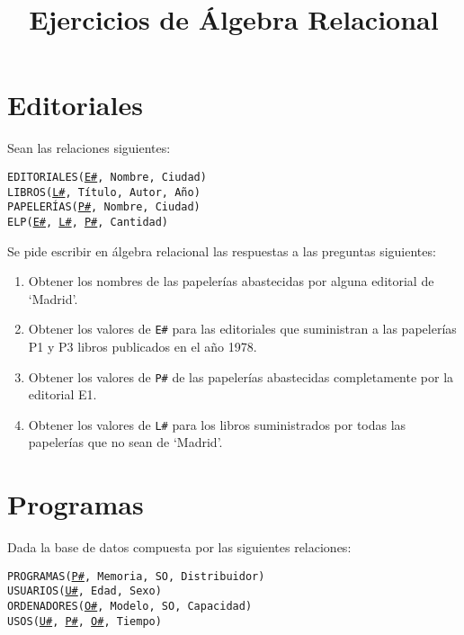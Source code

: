 \documentclass{db-practice}
\begin{document}
\title{Ejercicios de Álgebra Relacional}

\section{Editoriales}

Sean las relaciones siguientes:

\begin{addmargin}[1.5em]{0em}
    \texttt{EDITORIALES(\underline{E\#}, Nombre, Ciudad)}\\
    \texttt{LIBROS(\underline{L\#}, Título, Autor, Año)}\\
    \texttt{PAPELERÍAS(\underline{P\#}, Nombre, Ciudad)}\\
    \texttt{ELP(\underline{E\#}, \underline{L\#}, \underline{P\#}, Cantidad)}
\end{addmargin}


Se pide escribir en álgebra relacional las respuestas a las preguntas siguientes:

\begin{enumerate}
    \item Obtener los nombres de las papelerías abastecidas por alguna editorial de `Madrid'.
    \item Obtener los valores de \texttt{E\#} para las editoriales que suministran a las papelerías P1 y P3 libros publicados en el año 1978.
    \item Obtener los valores de \texttt{P\#} de las papelerías abastecidas completamente por la editorial E1.
    \item Obtener los valores de \texttt{L\#} para los libros suministrados por todas las papelerías que no sean de `Madrid'.
\end{enumerate}

\section{Programas}

Dada la base de datos compuesta por las siguientes relaciones:

\begin{addmargin}[1.5em]{0em}
    \texttt{PROGRAMAS(\underline{P\#}, Memoria, SO, Distribuidor)}\\
    \texttt{USUARIOS(\underline{U\#}, Edad, Sexo)}\\
    \texttt{ORDENADORES(\underline{O\#}, Modelo, SO, Capacidad)}\\
    \texttt{USOS(\underline{U\#}, \underline{P\#}, \underline{O\#}, Tiempo)}
\end{addmargin}
\end{document}
